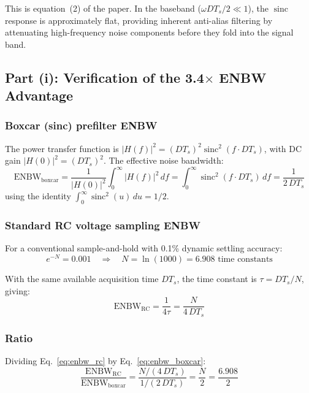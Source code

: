 \documentclass{article}
\begin{document}
This is equation~(2) of the paper. In the baseband ($\omega DT_s/2 \ll 1$), the $\operatorname{sinc}$ response is approximately flat, providing inherent anti-alias filtering by attenuating high-frequency noise components before they fold into the signal band.

\subsection{Part (i): Verification of the 3.4$\times$ ENBW Advantage}

\subsubsection{Boxcar (sinc) prefilter ENBW}

The power transfer function is $|H(f)|^2 = (DT_s)^2 \operatorname{sinc}^2(f \cdot DT_s)$, with DC gain $|H(0)|^2 = (DT_s)^2$. The effective noise bandwidth:
\begin{equation}
    \text{ENBW}_\text{boxcar} = \frac{1}{|H(0)|^2} \int_0^{\infty} |H(f)|^2\, df = \int_0^{\infty} \operatorname{sinc}^2(f \cdot DT_s)\, df = \frac{1}{2\, DT_s}
    \label{eq:enbw_boxcar}
\end{equation}
using the identity $\int_0^{\infty} \operatorname{sinc}^2(u)\, du = 1/2$.

\subsubsection{Standard RC voltage sampling ENBW}

For a conventional sample-and-hold with 0.1\% dynamic settling accuracy:
\begin{equation}
    e^{-N} = 0.001 \quad\Rightarrow\quad N = \ln(1000) = 6.908 \text{ time constants}
\end{equation}

With the same available acquisition time $DT_s$, the time constant is $\tau = DT_s/N$, giving:
\begin{equation}
    \text{ENBW}_\text{RC} = \frac{1}{4\tau} = \frac{N}{4\, DT_s}
    \label{eq:enbw_rc}
\end{equation}

\subsubsection{Ratio}

Dividing Eq.~\eqref{eq:enbw_rc} by Eq.~\eqref{eq:enbw_boxcar}:
\begin{equation}
    \frac{\text{ENBW}_\text{RC}}{\text{ENBW}_\text{boxcar}} = \frac{N/(4\, DT_s)}{1/(2\, DT_s)} = \frac{N}{2} = \frac{6.908}{2}
\end{equation}
\end{document}
